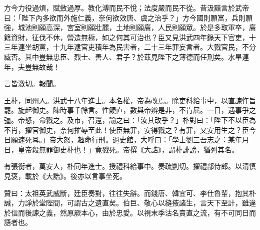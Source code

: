 \begin{pinyinscope}
方今力役過煩，賦斂過厚。教化溥而民不悅；法度嚴而民不從。昔汲黯言於武帝曰：「陛下內多欲而外施仁義，奈何欲效唐、虞之治乎？」方今國則願富，兵則願強，城池則願高深，宮室則願壯麗，土地則願廣，人民則願眾。於是多取軍卒，廣籍資財，征伐不休，營造無極，如之何其可治也？臣又見洪武四年錄天下官吏，十三年連坐胡黨，十九年逮官吏積年為民害者，二十三年罪妄言者。大戮官民，不分臧否。其中豈無忠臣、烈士、善人、君子？於茲見陛下之薄德而任刑矣。水旱連年，夫豈無故哉！

言皆激切。報聞。

王朴，同州人。洪武十八年進士。本名權，帝為改焉。除吏科給事中，以直諫忤旨罷。旋起御史。陳時事千餘言。性鯁直，數與帝辨是非，不肯屈。一日，遇事爭之彊。帝怒，命戮之。及市，召還，諭之曰：「汝其改乎？」朴對曰：「陛下不以臣為不肖，擢官御史，奈何摧辱至此！使臣無罪，安得戮之？有罪，又安用生之？臣今日願速死耳。」帝大怒，趣命行刑。過史館，大呼曰：「學士劉三吾志之：某年月日，皇帝殺無罪御史朴也！」竟戮死。帝撰《大誥》，謂朴誹謗，猶列其名。

有張衡者，萬安人，朴同年進士。授禮科給事中。奏疏剴切。擢禮部侍郎。以清慎見褒，載於《大誥》。後亦以言事坐死。

贊曰：太祖英武威斷，廷臣奏對，往往失辭。而錢唐、韓宜可、李仕魯輩，抱其朴誠，力諍於堂陛間，可謂古之遺直矣。伯巨、敬心以縫掖諸生，言天下至計，雖違於信而後諫之義，然原厥本心，由於忠愛。以視末季沽名賣直之流，有不可同日而語者也。


\end{pinyinscope}